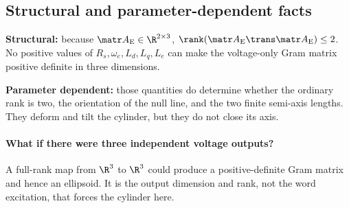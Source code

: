 \subsection{Structural and parameter-dependent facts}

\textbf{Structural:} because $\Ae\in\R^{2\times3}$,
$\rank(\Ae\trans\Ae)\leq2$.  No positive values of
$R_s,\omega_e,L_d,L_q,L_e$ can make the voltage-only Gram matrix positive
definite in three dimensions.

\textbf{Parameter dependent:} those quantities do determine whether the
ordinary rank is two, the orientation of the null line, and the two finite
semi-axis lengths.  They deform and tilt the cylinder, but they do not close
its axis.

\paragraph{What if there were three independent voltage outputs?}
A full-rank map from $\R^3$ to $\R^3$ could produce a positive-definite Gram
matrix and hence an ellipsoid.  It is the output dimension and rank, not the
word excitation, that forces the cylinder here.
